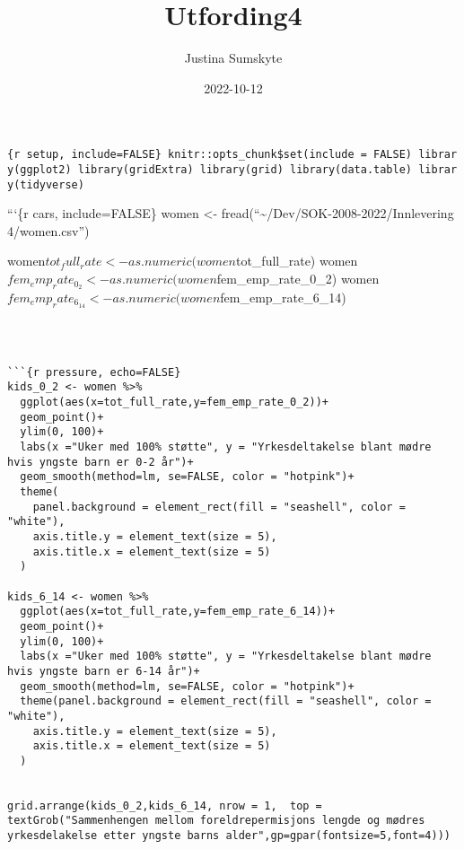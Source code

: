 \documentclass[
]{article}
\title{Utfording4}
\author{Justina Sumskyte}
\date{2022-10-12}
\begin{document}
\maketitle

\texttt{\{r\ setup,\ include=FALSE\}\ knitr::opts\_chunk\$set(include\ =\ FALSE)\ library(ggplot2)\ library(gridExtra)\ library(grid)\ library(data.table)\ library(tidyverse)}

```\{r cars, include=FALSE\} women \textless-
fread(``\textasciitilde/Dev/SOK-2008-2022/Innlevering 4/women.csv'')

women\(tot_full_rate<-as.numeric(women\)tot\_full\_rate)
women\(fem_emp_rate_0_2<-as.numeric(women\)fem\_emp\_rate\_0\_2)
women\(fem_emp_rate_6_14<-as.numeric(women\)fem\_emp\_rate\_6\_14)

\begin{verbatim}



```{r pressure, echo=FALSE}
kids_0_2 <- women %>%
  ggplot(aes(x=tot_full_rate,y=fem_emp_rate_0_2))+
  geom_point()+
  ylim(0, 100)+
  labs(x ="Uker med 100% støtte", y = "Yrkesdeltakelse blant mødre hvis yngste barn er 0-2 år")+
  geom_smooth(method=lm, se=FALSE, color = "hotpink")+
  theme(
    panel.background = element_rect(fill = "seashell", color = "white"),
    axis.title.y = element_text(size = 5),
    axis.title.x = element_text(size = 5)
  )

kids_6_14 <- women %>%
  ggplot(aes(x=tot_full_rate,y=fem_emp_rate_6_14))+
  geom_point()+
  ylim(0, 100)+
  labs(x ="Uker med 100% støtte", y = "Yrkesdeltakelse blant mødre hvis yngste barn er 6-14 år")+
  geom_smooth(method=lm, se=FALSE, color = "hotpink")+
  theme(panel.background = element_rect(fill = "seashell", color = "white"),
    axis.title.y = element_text(size = 5),
    axis.title.x = element_text(size = 5)
  )


grid.arrange(kids_0_2,kids_6_14, nrow = 1,  top = textGrob("Sammenhengen mellom foreldrepermisjons lengde og mødres yrkesdelakelse etter yngste barns alder",gp=gpar(fontsize=5,font=4)))

\end{verbatim}
\end{document}
